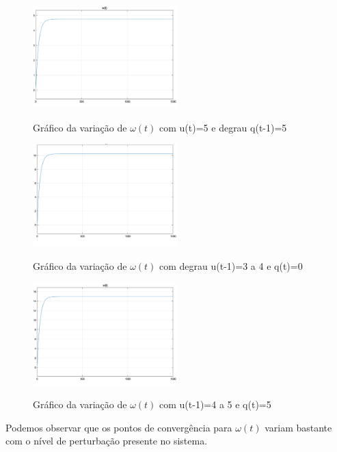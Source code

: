 \documentclass[11pt]{article}
\begin{document}
\begin{figure}[H]
	\centering
	{\includegraphics[width=0.5\textwidth]
		{assets/q1_u(t)_3_q(t)_0to5.png}}
	\caption{Gráfico da variação de $\omega(t)$ com u(t)=5 e degrau q(t-1)=5}
\end{figure}

\begin{figure}[H]
	\centering
	{\includegraphics[width=0.5\textwidth]
		{assets/q1_u(t)_3to4_q(t)_0.png}}
	\caption{Gráfico da variação de $\omega(t)$ com degrau u(t-1)=3 a 4 e q(t)=0}
\end{figure}

\begin{figure}[H]
	\centering
	{\includegraphics[width=0.5\textwidth]
		{assets/q1_u(t)_4to5_q(t)_5.png}}
	\caption{Gráfico da variação de $\omega(t)$ com u(t-1)=4 a 5 e q(t)=5}
\end{figure}

Podemos observar que os pontos de convergência para $\omega(t)$ variam bastante com o nível de perturbação
presente no sistema.
\end{document}

